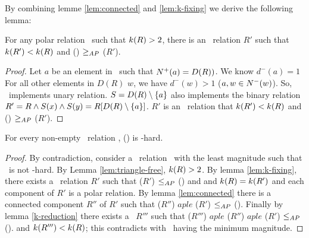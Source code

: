 By combining lemme \ref{lem:connected} and \ref{lem:k-fixing} 
we derive the following lemma:

\begin{lemma} \label{lem:k-reduction}
For any polar relation \mR\ such that \(\magf(R) > 2\),
there is an \RBA\ relation \(R'\) such that \(\magf(R') < \magf(R)\)
and \ccsp(\mR) \(\apge\) \ccsp(\(R'\))\@.
\end{lemma}


\begin{proof}
Let \(a\) be an element in \mR\ such that \(\nplus a = D(R))\)\@.
We know \(d^-(a)=1\) 
For all other elements in \(D(R)\) \(w\), 
we have \(d^-(w) > 1\) (\(a,w\in \nminus w\)). So, \mR\
implements unary relation.
\(S = D(R)\setminus \setof a\) also
implements the binary relation 
\(R'=R \land S(x) \land S(y) = 
R[D(R) \setminus \setof a]\).
\(R'\) is an \RBA\ relation that \(\magf(R') < \magf(R)\) 
and \ccsp(\mR) \(\apge\) \ccsp(\(R'\))\@.
\end{proof}

\begin{theorem}
For every non-empty \RBA\ relation \mR, \ccsp(\mR) is \cbis-hard.
\end{theorem}


\begin{proof}
By contradiction, consider a \RBA\ relation \mR\ with the least magnitude
such that \mR\ is not \cbis-hard. By Lemma \ref{lem:triangle-free},
\(\magf(R) > 2\)\@. 
By lemma \ref{lem:k-fixing}, there exists a \RBA\ relation \(R'\) such that 
\ccsp(\(R'\)) \(\aple\) \ccsp(\mR) and  
and \(\magf(R)=\magf(R')\) and each component of \(R'\) is a polar relation. 
By lemma \ref{lem:connected} there is a connected component \(R''\)
of \(R'\) such that \ccsp(\(R''\)) \(aple\) \ccsp(\(R'\)) \(\aple\) \ccsp(\mR).
Finally  by lemma \ref{k-reduction} 
there exists a \RBA\ \(R'''\) such that 
\ccsp(\(R'''\)) \(aple\) \ccsp(\(R''\)) \(aple\) \ccsp(\(R'\)) \(\aple\) \ccsp(\mR).
and \(\magf(R''') < \magf(R)\); this contradicts with \mR\ having the minimum magnitude.
\end{proof}
